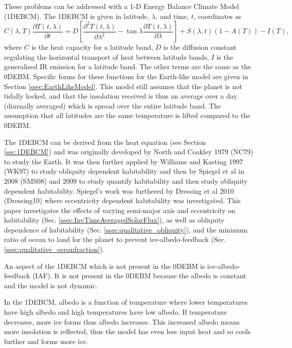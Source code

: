 \documentclass[12pt, onecolumn]{revtex4-2}    %
\newcommand{\partialderiv}[2]{\frac{\partial {#1}}{\partial {#2}}}
\newcommand{\partialderivsecnd}[2]{\frac{\partial^2 {#1}}{\partial {#2}^2}}
\begin{document}
%
These problems can be addressed with a 1-D Energy Balance Climate Model (1DEBCM).
The 1DEBCM is given in latitude, $\lambda$, and time, $t$, coordinates as
\begin{equation}
  C(\lambda, T) \partialderiv{T(t, \lambda)}{t} = D\left[\partialderivsecnd{T(t, \lambda)}{\lambda} - \tan\lambda\partialderiv{T(t, \lambda)}{\lambda}\right] + S(\lambda, t)(1-A(T)) - I(T),
  \label{eq:1DEBCM}
\end{equation}
where $C$ is the heat capacity for a latitude band, $D$ is the diffusion constant regulating the horizontal transport of heat between latitude bands, $I$ is the generalised IR emission for a latitude band. 
The other terms are the same as the 0DEBM.
Specific forms for these functions for the Earth-like model are given in Section \ref{ssec:EarthLikeModel}.
This model still assumes that the planet is not tidally locked, and that the insolation received is thus an average over a day (diurnally averaged) which is spread over the entire latitude band.
The assumption that all latitudes are the same temperature is lifted compared to the 0DEBM.

The 1DEBCM can be derived from the heat equation (see Section \ref{sec:1DEBCM}) and was originally developed by North and Coakley 1979 (NC79) \cite{NC79} to study the Earth.
It was then further applied by Williams and Kasting 1997 (WK97) \cite{WK97} to study obliquity dependent habitability and then by Spiegel et al in 2008 (SMS08) \cite{SMS08} and 2009 \cite{SMS09} to study quantify habitability and then study obliquity dependent habitability.
Spiegel's work was furthered by Dressing et al 2010 (Dressing10) \cite{Dressing10} where eccentricity dependent habitability was investigated.
This paper investigates the effects of varying semi-major axis and eccentricity on habitability (Sec. \ref{ssec:InvTimeAveragedSolarFlux}), as well as obliquity dependence of habitability (Sec. \ref{ssec:qualitative_obliquity}), and the minimum ratio of ocean to land for the planet to prevent ice-albedo-feedback (Sec. \ref{ssec:qualitative_oceanfraction}).

%
An aspect of the 1DEBCM which is not present in the 0DEBM is ice-albedo-feedback (IAF).
It is not present in the 0DEBM because the albedo is constant and the model is not dynamic.

In the 1DEBCM, albedo is a function of temperature where lower temperatures have high albedo and high temperatures have low albedo.
If temperature decreases, more ice forms thus albedo increases.
This increased albedo means more insolation is reflected, thus the model has even less input heat and so cools further and forms more ice.
\end{document}
